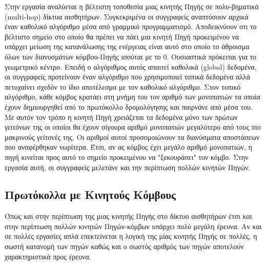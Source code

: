 Στην εργασία \cite{deploying_multiple_sinks_wsns} αναλύεται η βέλτιστη τοποθεσία μιας κινητής Πηγής σε πολυ-βηματικά (multi-hop) δίκτυα αισθητήρων. Συγκεκριμένα οι
συγγραφείς αναπτύσουν αρχικά έναν καθολικό αλγόριθμο μέσα από γραμμικό προγραμματισμό. Αποδεικνύουν οτι το βέλτιστο σημείο στο οποίο θα πρέπει να πάει μια κινητή Πηγή
προκειμένου να υπάρχει μείωση της κατανάλωσης της ενέργειας είναι αυτό στο οποίο το άθροισμα όλων των διανυσμάτων κόμβου-Πηγής ισούται με το 0. Ουσιαστικά πρόκειται
για το γεωμετρικό κέντρο. Επειδή ο αλγόριθμος αυτός απαιτεί καθολικά (global) δεδομένα, οι συγγραφείς προτείνουν έναν αλγόριθμο που χρησιμοποιεί τοπικά δεδομένα αλλά
πετυχαίνει σχεδόν το ίδιο αποτέλεσμα με τον καθολικό αλγόριθμο. Στον τοπικό αλγόριθμο, κάθε κόμβος κρατάει στη μνήμη του τον αριθμό των μονοπατιών τα οποία έχουν
δημιουργηθεί από το πρωτόκολλο δρομολόγησης και παιρνάνε από μέσα του. Με αυτόν τον τρόπο η κινητή Πηγή χρειάζεται τα δεδομένα μόνο των πρώτων γειτόνων της οι οποίοι
θα έχουν σίγουρα αριθμό μονοπατιών μεγαλύτερο από τους πιο μακρινούς γείτονές της. Οι αριθμοί αυτοί προσομοιώνουν τα διανύσματα αποστάσεων που αναφέρθηκαν νωρίτερα.
Έτσι, αν ας κόμβος έχει μεγάλο αριθμό μονοπατιών, η πηγή κινείται προς αυτό το σημείο προκειμένου να "ξεκουράσει" τον κόμβο. Στην εργασία αυτή, οι συγγραφείς
μελετάνε και την περίπτωση πολλών κινητών Πηγών.

\subsection{Πρωτόκολλα με Κινητούς Κόμβους} %
Όπως και στην περίπτωση της μιας κινητής Πηγής στο δίκτυο αισθητήρων έτσι και στην περίπτωση πολλών κινητών Πηγών-κόμβων υπάρχει πολύ μεγάλη έρευνα. Αν και σε πολλές
εργασίες απλά επεκτείνεται η λογική της μίας κινητής Πηγής σε πολλές, η σωστή κατανομή των πηγών καθώς και ο σωστός αριθμός των πηγών αποτελούν χαρακτηριστικά προς
έρευνα.

